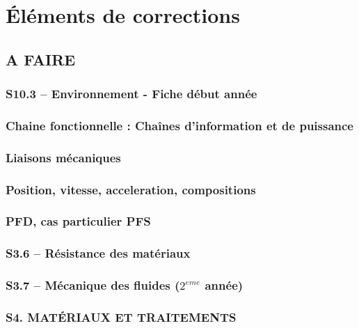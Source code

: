 \documentclass[
	11pt, %
	fleqn, %
	a4paper, %
]{LegrandOrangeBook}
\begin{document}

\chapterspaceabove{6.25cm} %
\chapterspacebelow{7.5cm} %


\chapter{Éléments de corrections}


\section{A FAIRE}
\subsection{S10.3 – Environnement - Fiche début année}
\subsection{Chaine fonctionnelle : Chaînes d’information et de puissance}
\subsection{Liaisons mécaniques}
\subsection{Position, vitesse, acceleration, compositions}
\subsection{PFD, cas particulier PFS}
\subsection{S3.6 – Résistance des matériaux}
\subsection{S3.7 – Mécanique des fluides ($2^{eme}$ année)}
\subsection{S4. MATÉRIAUX ET TRAITEMENTS}
\end{document}
